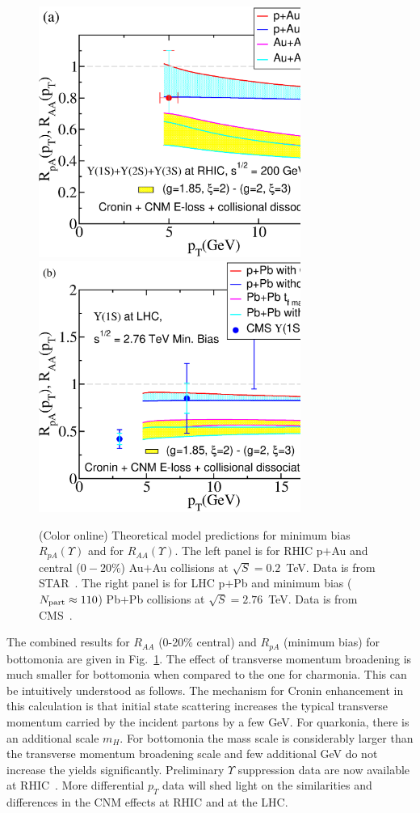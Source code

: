 \documentclass[article,showpacs,preprintnumbers,amsmath,amssymb]{revtex4}
\begin{document}
\begin{figure}[!t]
\vspace*{.2in}
\includegraphics[width=3.38in,angle=0]{fig23_rhic0200upsilon123cronin.eps}
\includegraphics[width=3.38in,angle=0]{fig24_lhc2760upsilonminbiascronin.eps} 
\caption{(Color online) Theoretical model predictions for  minimum bias
$R_{pA}(\Upsilon)$ and for $R_{AA}(\Upsilon)$. The left panel is for RHIC p$+$Au and
central ($0-20\%$) Au$+$Au collisions at  $\sqrt{S}=0.2$~TeV.  Data is from
STAR~\cite{Reed:}. The right panel is for LHC p$+$Pb and minimum bias
($N_{\rm{part}}\approx 110$) Pb$+$Pb collisions at $\sqrt{S}=2.76$~TeV.  Data
is from CMS~\cite{Chatrchyan:2012np}.~\label{fig:RpAU1}} 
\end{figure}

The combined results for $R_{AA}$ (0-20\% central) and $R_{pA}$ (minimum bias)
for bottomonia are given in Fig.~\ref{fig:RpAU1}. The effect of transverse
momentum broadening is much smaller for bottomonia when compared to the one for
charmonia. This can be intuitively understood as follows. The mechanism for
Cronin enhancement in this calculation is that initial state scattering
increases the typical transverse momentum carried by the incident partons by a
few GeV. For quarkonia, there is an additional scale $m_H$. For bottomonia the
mass scale is considerably larger than the transverse momentum broadening scale
and few additional GeV do not increase the yields significantly. Preliminary
$\Upsilon $ suppression data are now available at RHIC~\cite{Reed:}. More
differential $p_T$ data will shed light on the similarities and differences in
the CNM effects at RHIC and at the LHC.
\end{document}
